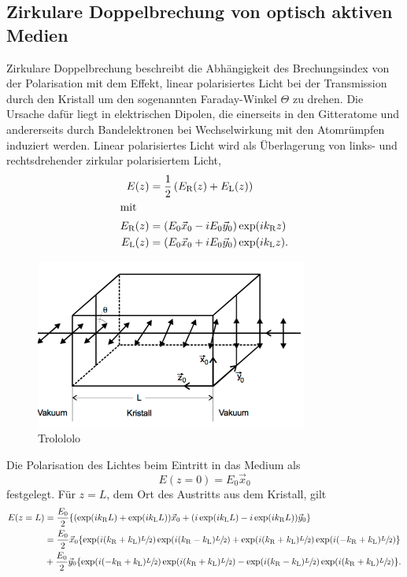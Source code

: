\subsection{Zirkulare Doppelbrechung von optisch aktiven Medien}
\label{sec:doppel_aktiv}
Zirkulare Doppelbrechung beschreibt die Abhängigkeit des Brechungsindex von der Polarisation mit dem Effekt,
linear polarisiertes Licht bei der Transmission durch den Kristall um den sogenannten Faraday-Winkel $\Theta$ zu drehen.
Die Ursache dafür liegt in elektrischen Dipolen, die einerseits in den Gitteratome und
andererseits durch Bandelektronen bei Wechselwirkung mit den Atomrümpfen induziert werden.
Linear polarisiertes Licht wird als Überlagerung von links- und rechtsdrehender zirkular polarisiertem Licht,
\begin{align}
    E(z) &= \frac{1}{2} \left(E_\text{R}(z)+E_\text{L}(z)\right)\\
    \shortintertext{mit}
    E_\text{R}(z) &= (E_0 \vec x_0 - i E_0 \vec y_0) \exp(ik_\text{R}z)\\
    E_\text{L}(z) &= (E_0 \vec x_0 + i E_0 \vec y_0) \exp(ik_\text{L}z).
\end{align}
\begin{figure}[h]
    \centering
    \includegraphics[width=0.8\textwidth]{graphics/drehung.png}
    \caption{Trolololo \cite{skript}}
    \label{fig:drehung}
\end{figure}
Die Polarisation des Lichtes beim Eintritt in das Medium als
\begin{equation}
    E(z=0) = E_0 \vec x_0
\end{equation}
festgelegt.
Für $z = L$, dem Ort des Austritts aus dem Kristall, gilt
\begin{alignat}{3}
    E(z=L) &= \frac{E_0}{2} \{ (\exp(ik_\text{R}L)+\exp(ik_\text{L}L))\vec x_0 + (i\exp(ik_\text{L}L)-i\exp(ik_\text{R}L))\vec y_0\}\\
    &= \frac{E_0}{2} \vec x_0 \{ \exp(i(k_\text{R}+k_\text{L})\sfrac{L}{2})\exp(i(k_\text{R}-k_\text{L})\sfrac{L}{2}) + \exp(i(k_\text{R}+k_\text{L})\sfrac{L}{2})\exp(i(-k_\text{R}+k_\text{L})\sfrac{L}{2})\}\\
    &+ \frac{E_0}{2}\vec y_0 \{ \exp(i(-k_\text{R}+k_\text{L})\sfrac{L}{2})\exp(i(k_\text{R}+k_\text{L})\sfrac{L}{2}) - \exp(i(k_\text{R}-k_\text{L})\sfrac{L}{2})\exp(i(k_\text{R}+k_\text{L})\sfrac{L}{2}) \}.
\end{alignat}
